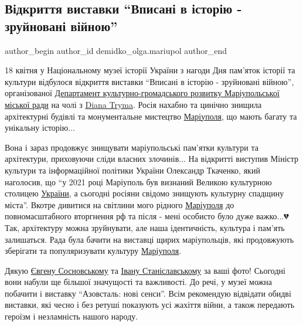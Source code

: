  
 
 
 
 

\subsection{Відкриття виставки \enquote{Вписані в історію - зруйновані війною}}
\label{sec:18_04_2023.fb.demidko_olga.mariupol.1.vidkryttja_vystavky_vpysani_v_istoriu_zrujnovani_vijnoju}

\ifcmt
 author_begin
   author_id demidko_olga.mariupol
 author_end
\fi

18 квітня у Національному музеї історії України з нагоди Дня пам'яток історії
та культури  відбулося відкриття виставки \enquote{Вписані в історію - зруйновані
війною}, організованої \href{\urlmkulturaIA}{Департамент культурно-громадського розвитку
Маріупольської міської ради} на чолі з \href{\urlDianaTrymaMariupolIA}{Diana Tryma}. Росія нахабно та цинічно
знищила архітектурні будівлі та монументальне мистецтво \href{\urlMariupolIA}{Маріуполя}, що мають
багату та унікальну історію... 

Вона і зараз продовжує знищувати маріупольські
пам'ятки культури та архітектури, приховуючи сліди власних злочинів... На
відкритті виступив Міністр культури та інформаційної політики України
Олександр Ткаченко, який наголосив, що \enquote{у 2021 році Маріуполь був визнаний
Великою культурною столицею \href{\urlUkrainaIA}{України}, а сьогодні росіяни свідомо знищують
культурну спадщину міста}. Вкотре дивитися на світлини мого рідного \href{\urlMariupolIA}{Маріуполя}
до повномасштабного вторгнення рф та після - мені особисто було дуже важко...💔
Так, архітектуру можна зруйнувати, але наша ідентичність, культура і пам'ять
залишаться.  Рада була бачити на виставці щирих маріупольців, які продовжують
зберігати та популяризувати культуру \href{\urlMariupolIA}{Маріуполя}. 

Дякую \href{\urlSosnovskyMariupolIA}{Євгену Сосновському} та \href{\urlIvanStanislavskiiMariupolIA}{Івану
Станіславському} за ваші фото! Сьогодні вони набули ще більшої значущості та
важливості. До речі, у музеї можна побачити і виставку \enquote{Азовсталь: нові сенси}.
Всім рекомендую відвідати обидві виставки, які чесно і без ретуші показують усі
жахіття війни, а також передають героїзм і незламність нашого народу.

